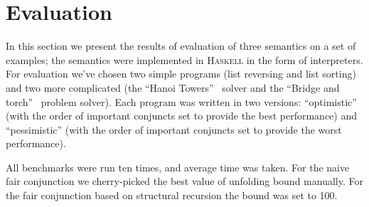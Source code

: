 \section{Evaluation}

In this section we present the results of evaluation of three semantics on a set of examples; the semantics were implemented in \textsc{Haskell} in the form of interpreters.
For evaluation we've chosen two simple programs (list reversing and list sorting) and two more complicated (the ``Hanoi Towers''~\cite{?} solver and the
``Bridge and torch''~\cite{?} problem solver).
Each program was written in two versions: ``optimistic'' (with the order of important conjuncts set to provide the best performance) and ``pessimistic'' (with the order of important
conjuncts set to provide the worst performance).

All benchmarks were run ten times, and average time was taken. For the naive fair conjunction we cherry-picked the best value of unfolding bound manually. For the fair conjunction
based on structural recursion the bound was set to 100.

